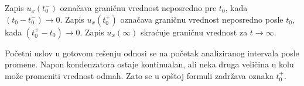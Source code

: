 Zapis $u_x(t_0^-)$ označava graničnu vrednost neposredno pre $t_0$, kada $(t_0-t_0^-)\to0$. Zapis $u_x(t_0^+)$ označava graničnu vrednost neposredno posle $t_0$, kada $(t_0^+-t_0)\to0$. Zapis $u_x(\infty)$ skraćuje graničnu vrednost za $t\to\infty$.

Početni uslov u gotovom rešenju odnosi se na početak analiziranog intervala posle promene. Napon kondenzatora ostaje kontinualan, ali neka druga veličina u kolu može promeniti vrednost odmah. Zato se u opštoj formuli zadržava oznaka $t_0^+$.
